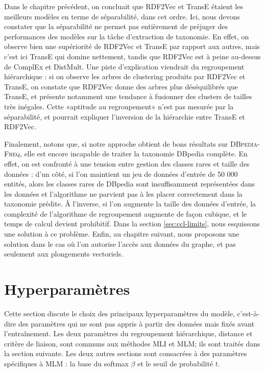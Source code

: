 Dans le chapitre précédent, on concluait que RDF2Vec et TransE étaient les meilleurs modèles en terme de séparabilité, dans cet ordre. Ici, nous devons constater que la séparabilité ne permet pas entièrement de préjuger des performances des modèles sur la tâche d'extraction de taxonomie. En effet, on observe bien une supériorité de RDF2Vec et TransE par rapport aux autres, mais c'est ici TransE qui domine nettement, tandis que RDF2Vec est à peine au-dessus de ComplEx et DistMult. Une piste d'explication viendrait du regroupement hiérarchique : si on observe les arbres de clustering produits par RDF2Vec et TransE, on constate que RDF2Vec donne des arbres plus déséquilibrés que TransE, et présente notamment une tendance à fusionner des clusters de tailles très inégales. Cette «aptitude au regroupement» n'est pas mesurée par la séparabilité, et pourrait expliquer l'inversion de la hiérarchie entre TransE et RDF2Vec. 

Finalement, notons que, si notre approche obtient de bons résultats sur \textsc{DBpedia-Freq}, elle est encore incapable de traiter la taxonomie DBpedia complète. En effet, on est confronté à une tension entre gestion des classes rares et taille des données :
d'un côté, si l'on maintient un jeu de données d'entrée de 50 000 entités, alors les classes rares de DBpedia sont insuffisamment représentées dans les données et l'algorithme ne parvient pas à les placer correctement dans la taxonomie prédite. À l'inverse, si l'on augmente la taille des données d'entrée, la complexité de l'algorithme de regroupement augmente de façon cubique, et le temps de calcul devient prohibitif. 
Dans la section \ref{sec:ccl-limits}, nous esquissons une solution à ce problème. Enfin, au chapitre suivant, nous proposons une solution dans le cas où l'on autorise l'accès aux données du graphe, et pas seulement aux plongements vectoriels.


\FloatBarrier

\section{Hyperparamètres}
\label{sec:te-hp}

Cette section discute le choix des principaux hyperparamètres du modèle, c'est-à-dire des paramètres qui ne sont pas appris à partir des données mais fixés avant l'entraînement. Les deux paramètres du regroupement hiérarchique, distance et critère de liaison, sont communs aux méthodes MLI et MLM; ils sont traités dans la section suivante. Les deux autres sections sont consacrées à des paramètres spécifiques à MLM : la base du softmax $\beta$ et le seuil de probabilité $t$.

